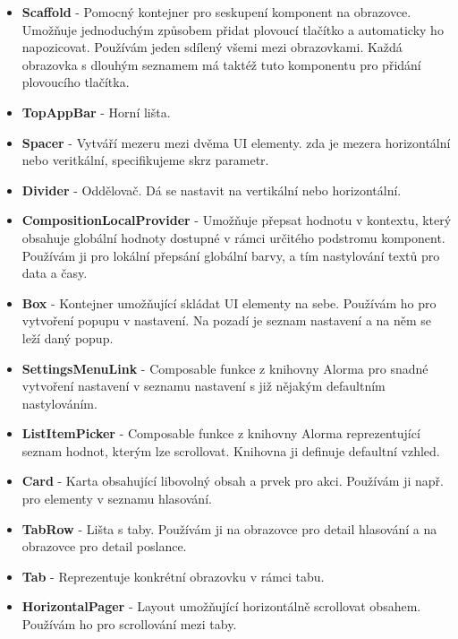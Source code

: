 \begin{itemize}
	\item \textbf{Scaffold} - Pomocný kontejner pro seskupení komponent na obrazovce. Umožňuje jednoduchým způsobem přidat plovoucí tlačítko a automaticky ho napozicovat. Používám jeden sdílený všemi mezi obrazovkami. Každá obrazovka s dlouhým seznamem má taktéž tuto komponentu pro přidání plovoucího tlačítka.

	\item \textbf{TopAppBar} - Horní lišta.

	\item \textbf{Spacer} - Vytváří mezeru mezi dvěma UI elementy. zda je mezera horizontální nebo veritkální, specifikujeme skrz parametr.

	\item \textbf{Divider} - Oddělovač. Dá se nastavit na vertikální nebo horizontální.

	\item \textbf{CompositionLocalProvider} - Umožňuje přepsat hodnotu v kontextu, který obsahuje globální hodnoty dostupné v rámci určitého podstromu komponent. Používám ji pro lokální přepsání globální barvy, a tím nastylování textů pro data a časy.

	\item \textbf{Box} - Kontejner umožňující skládat UI elementy na sebe. Používám ho pro vytvoření popupu v nastavení. Na pozadí je seznam nastavení a na něm se leží daný popup.

	\item \textbf{SettingsMenuLink} - Composable funkce z knihovny Alorma pro snadné vytvoření nastavení v seznamu nastavení s již nějakým defaultním nastylováním.

	\item \textbf{ListItemPicker} - Composable funkce z knihovny Alorma reprezentující seznam \linebreak hodnot, kterým lze scrollovat. Knihovna ji definuje defaultní vzhled.

	\item \textbf{Card} - Karta obsahující libovolný obsah a prvek pro akci. Používám ji např. pro elementy \linebreak v seznamu hlasování.

	\item \textbf{TabRow} - Lišta s taby. Používám ji na obrazovce pro detail hlasování a na obrazovce pro detail poslance.

	\item \textbf{Tab} - Reprezentuje konkrétní obrazovku v rámci tabu.

	\item \textbf{HorizontalPager} - Layout umožňující horizontálně scrollovat obsahem. Používám ho pro scrollování mezi taby.
\end{itemize}

